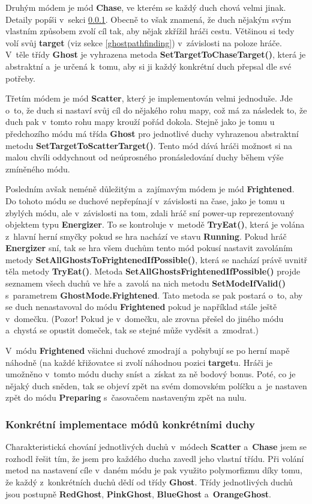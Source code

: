 \documentclass[a4]{article}
\begin{document}
Druhým módem je mód \textbf{Chase}, ve kterém se každý duch chová velmi jinak. Detaily popíši v~sekci \ref{concretemodes}. Obecně to však znamená, že duch nějakým svým vlastním způsobem zvolí cíl tak, aby nějak zkřížil hráči cestu. Většinou si tedy volí svůj \textbf{target} (viz sekce \ref{ghostpathfinding}) v~závislosti na poloze hráče. V~těle třídy \textbf{Ghost} je vyhrazena metoda \textbf{SetTargetToChaseTarget()}, která je abstraktní a~je určená k~tomu, aby si ji každý konkrétní duch přepsal dle své potřeby.

Třetím módem je mód \textbf{Scatter}, který je implementován velmi jednoduše. Jde o~to, že duch si nastaví svůj cíl do nějakého rohu mapy, což má za následek to, že duch pak v~tomto rohu mapy krouží pořád dokola. Stejně jako je tomu u předchozího módu má třída \textbf{Ghost} pro jednotlivé duchy vyhrazenou abstraktní metodu \textbf{SetTargetToScatterTarget()}. Tento mód dává hráči možnost si na malou chvíli oddychnout od neúprosného pronásledování duchy během výše zmíněného módu.

Posledním avšak neméně důležitým a~zajímavým módem je mód \textbf{Frightened}. Do tohoto módu se duchové nepřepínají v~závislosti na čase, jako je tomu u zbylých módu, ale v~závislosti na tom, zdali hráč sní power-up reprezentovaný objektem typu \textbf{Energizer}. To se kontroluje v~metodě \textbf{TryEat()}, která je volána z~hlavní herní smyčky pokud se hra nachází ve stavu \textbf{Running}. Pokud hráč \textbf{Energizer} sní, tak se hra všem duchům tento mód pokusí nastavit zavoláním metody \textbf{SetAllGhostsToFrightenedIfPossible()}, která se nachází právě uvnitř těla metody \textbf{TryEat()}. Metoda \textbf{SetAllGhostsFrightenedIfPossible()} projde seznamem všech duchů ve hře a~zavolá na nich metodu \textbf{SetModeIfValid()} s~parametrem \textbf{GhostMode.Frightened}. Tato metoda se pak postará o~to, aby se duch nenastavoval do módu \textbf{Frightened} pokud je například stále ještě v~domečku. (Pozor! Pokud je v~domečku, ale zrovna přešel do jiného módu a~chystá se opustit domeček, tak se stejné může vyděsit a~zmodrat.)

V~módu \textbf{Frightened} všichni duchové zmodrají a~pohybují se po herní mapě náhodně (na každé křižovatce si zvolí náhodnou pozici \textbf{target}u. Hráči je umožněno v~tomto módu duchy sníst a~získat za ně bodový bonus. Poté, co je nějaký duch sněden, tak se objeví zpět na svém domovském políčku a~je nastaven zpět do módu \textbf{Preparing} s~časovačem nastaveným zpět na nulu.

\subsubsection{Konkrétní implementace módů konkrétními duchy} \label{concretemodes}
Charakteristická chování jednotlivých duchů v~módech \textbf{Scatter} a~\textbf{Chase} jsem se rozhodl řešit tím, že jsem pro každého ducha zavedl jeho vlastní třídu. Při volání metod na nastavení cíle v~daném módu je pak využito polymorfizmu díky tomu, že každý z~konkrétních duchů dědí od třídy \textbf{Ghost}. Třídy jednotlivých duchů jsou postupně \textbf{RedGhost}, \textbf{PinkGhost}, \textbf{BlueGhost} a~\textbf{OrangeGhost}. 
\end{document}
